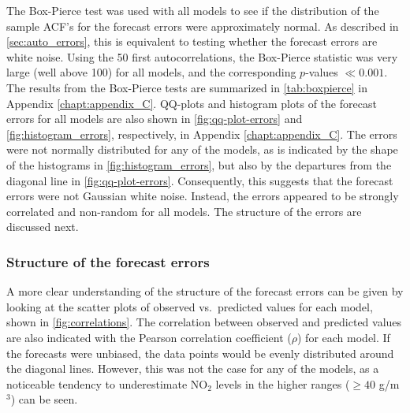 The Box-Pierce test was used with all models to see if the distribution of the sample ACF's for the forecast errors were approximately normal. As described in \cref{sec:auto_errors}, this is equivalent to testing whether the forecast errors are white noise. Using the 50 first autocorrelations, the Box-Pierce statistic was very large (well above 100) for all models, and the corresponding $p$-values $\ll0.001$. The results from the Box-Pierce tests are summarized in \cref{tab:boxpierce} in Appendix \ref{chapt:appendix_C}. QQ-plots and histogram plots of the forecast errors for all models are also shown in \cref{fig:qq-plot-errors} and \cref{fig:histogram_errors}, respectively, in Appendix \ref{chapt:appendix_C}. The errors were not normally distributed for any of the models, as is indicated by the shape of the histograms in \cref{fig:histogram_errors}, but also by the departures from the diagonal line in \cref{fig:qq-plot-errors}. Consequently, this suggests that the forecast errors were not Gaussian white noise. Instead, the errors appeared to be strongly correlated and non-random for all models. The structure of the errors are discussed next.


\subsubsection{Structure of the forecast errors}
A more clear understanding of the structure of the forecast errors can be given by looking at the scatter plots of observed vs.\ predicted values for each model, shown in \cref{fig:correlations}. The correlation between observed and predicted values are also indicated with the Pearson correlation coefficient ($\rho$) for each model. If the forecasts were unbiased, the data points would be evenly distributed around the diagonal lines. However, this was not the case for any of the models, as a noticeable tendency to underestimate NO$_2$ levels in the higher ranges ($ \geq 40$ \textmugreek g/m$^3$) can be seen.  



